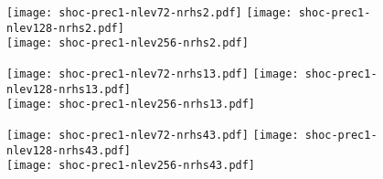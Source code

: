 \documentclass[10pt,twocolumn]{article}
\begin{document}
\begin{figure}[hbt]
  \centering
  \texttt{[image: shoc-prec1-nlev72-nrhs2.pdf]}
  \texttt{[image: shoc-prec1-nlev128-nrhs2.pdf]} \\
  \texttt{[image: shoc-prec1-nlev256-nrhs2.pdf]}
\end{figure}

\begin{figure}[hbt]
  \centering
  \texttt{[image: shoc-prec1-nlev72-nrhs13.pdf]}
  \texttt{[image: shoc-prec1-nlev128-nrhs13.pdf]} \\
  \texttt{[image: shoc-prec1-nlev256-nrhs13.pdf]}
\end{figure}

\begin{figure}[hbt]
  \centering
  \texttt{[image: shoc-prec1-nlev72-nrhs43.pdf]}
  \texttt{[image: shoc-prec1-nlev128-nrhs43.pdf]} \\
  \texttt{[image: shoc-prec1-nlev256-nrhs43.pdf]}
\end{figure}
\end{document}
